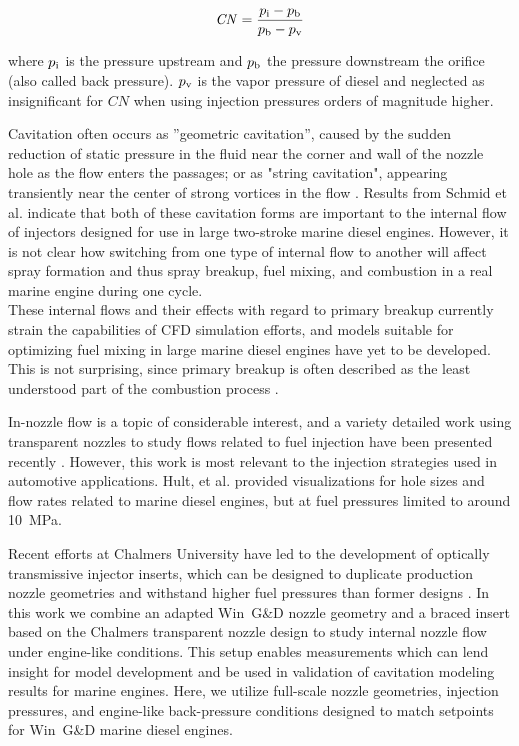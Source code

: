 \documentclass[letterpaper,twocolumn,10pt]{ilass}
\newcommand\CN{\ensuremath{\mathit{CN}}}
\begin{document}
\begin{align}
\CN = \frac{p\textsubscript{i} - p\textsubscript{b}}{p\textsubscript{b}-p\textsubscript{v}}
\label{cavitation}
\end{align}

where $p\textsubscript{i}$ is the pressure upstream and $p\textsubscript{b}$ the pressure
downstream the orifice (also called back pressure). $p\textsubscript{v}$ is the vapor pressure
of diesel and neglected as insignificant for $CN$ when using injection pressures orders of magnitude
higher.

Cavitation often occurs as ''geometric cavitation'', caused by the sudden reduction of
static pressure in the fluid near the corner and wall of the nozzle hole as the flow
enters the passages; or as "string cavitation", appearing transiently near the center of
strong vortices in the flow \cite{Andriotis2008}.
%
Results from Schmid et al. \cite{Schmid2014} indicate that both of these cavitation forms are important to the
internal flow of injectors designed for use in large two-stroke marine diesel engines.
However, it is not clear how switching from one type of internal flow to another will affect
spray formation and thus spray breakup, fuel mixing, and combustion in a real marine engine
during one cycle.\\
%
These internal flows and their effects with regard to primary breakup currently
strain the capabilities of CFD simulation efforts, and models suitable for optimizing
fuel mixing in large marine diesel engines have yet to be developed. 
%
This is not surprising, since primary breakup is often described as the least understood part of the combustion process \cite{Fansler2015,Linne2013}.

%
In-nozzle flow is a topic of considerable interest, and a variety detailed work using transparent nozzles to study flows related to fuel injection have been presented recently
\cite{Fansler2015, Blessing2003, Duke2014}.
However, this work is most relevant to the injection strategies used in automotive applications.
Hult, et al. \cite{Hult2016} provided visualizations for hole sizes and flow rates related to marine diesel engines, but at fuel pressures limited to around 10~MPa.

Recent efforts at Chalmers University have led to the development of optically
transmissive injector inserts, which can be designed to duplicate production nozzle geometries
and withstand higher fuel pressures than former designs \cite{Falgout2015}.
In this work we combine an adapted Win~G\&D nozzle geometry and a braced insert based on
the Chalmers transparent nozzle design to study internal nozzle flow under engine-like
conditions. This setup enables measurements which can lend insight for model development
and be used in validation of cavitation modeling results for marine engines.
%
Here, we utilize full-scale nozzle geometries, injection pressures, and engine-like
back-pressure conditions designed to match setpoints for Win~G\&D marine diesel engines. 
\end{document}
